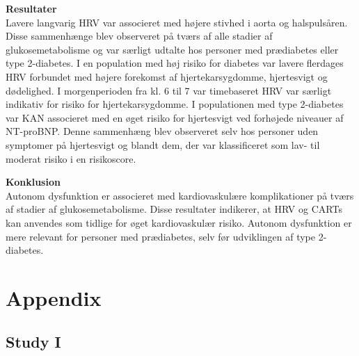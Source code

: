 \documentclass[
  a4paper,
  headsepline=true,
  open=left]{scrbook}
\begin{document}
\textbf{Resultater}\\
Lavere langvarig HRV var associeret med højere stivhed i aorta og
halspulsåren. Disse sammenhænge blev observeret på tværs af alle stadier
af glukosemetabolisme og var særligt udtalte hos personer med
prædiabetes eller type 2-diabetes. I en population med høj risiko for
diabetes var lavere flerdages HRV forbundet med højere forekomst af
hjertekarsygdomme, hjertesvigt og dødelighed. I morgenperioden fra kl. 6
til 7 var timebaseret HRV var særligt indikativ for risiko for
hjertekarsygdomme. I populationen med type 2-diabetes var KAN associeret
med en øget risiko for hjertesvigt ved forhøjede niveauer af NT-proBNP.
Denne sammenhæng blev observeret selv hos personer uden symptomer på
hjertesvigt og blandt dem, der var klassificeret som lav- til moderat
risiko i en risikoscore.

\textbf{Konklusion}\\
Autonom dysfunktion er associeret med kardiovaskulære komplikationer på
tværs af stadier af glukosemetabolisme. Disse resultater indikerer, at
HRV og CARTs kan anvendes som tidlige for øget kardiovaskulær risiko.
Autonom dysfunktion er mere relevant for personer med prædiabetes, selv
før udviklingen af type 2-diabetes.

\clearpage
\null
\thispagestyle{empty}
\clearpage

\cleardoublepage
{}
{}
\appendix

\hypertarget{sec-more-results}{%
\chapter{Appendix}\label{sec-more-results}}

\hypertarget{study-i-1}{%
\section{Study I}\label{study-i-1}}

\clearpage
\null
\thispagestyle{empty}
\clearpage






\newpage
\restoregeometry
\end{document}
